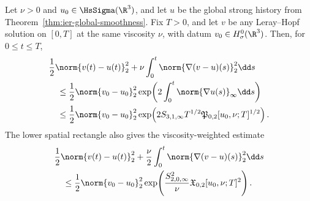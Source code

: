 \begin{theorem}
\label{thm:app-relative-energy}
Let \(\nu>0\) and \(u_0\in\HsSigma(\R^3)\), and let \(u\) be the global strong history
from Theorem~\ref{thm:ier-global-smoothness}.  Fix \(T>0\), and let \(v\) be
any Leray--Hopf solution on \([0,T]\) at the same viscosity \(\nu\), with
datum \(v_0\in H^0_\sigma(\R^3)\).  Then, for \(0\le t\le T\),
\begin{align}
 &\frac12\norm{v(t)-u(t)}_2^2
 +\nu\int_0^t\norm{\nabla(v-u)(s)}_2^2\dd s
 \notag\\
 &\quad\le
 \frac12\norm{v_0-u_0}_2^2
 \exp\!\left(
 2\int_0^t\norm{\nabla u(s)}_\infty\dd s
 \right)
 \label{eq:app-relative-energy-action}\\
 &\quad\le
 \frac12\norm{v_0-u_0}_2^2
 \exp\!\left(
 2S_{3,1,\infty}T^{1/2}
 \mathfrak P_{0,2}[u_0,\nu;T]^{1/2}
 \right).
 \label{eq:app-relative-energy-producer}
\end{align}
The lower spatial rectangle also gives the viscosity-weighted estimate
\begin{align}
 &\frac12\norm{v(t)-u(t)}_2^2
 +\frac\nu2\int_0^t\norm{\nabla(v-u)(s)}_2^2\dd s
 \notag\\
 &\quad\le
 \frac12\norm{v_0-u_0}_2^2
 \exp\!\left(
 \frac{S_{2,0,\infty}^2}{\nu}
 \mathfrak X_{0,2}[u_0,\nu;T]^2
 \right).
 \label{eq:app-relative-energy-low-rectangle}
\end{align}
\end{theorem}

